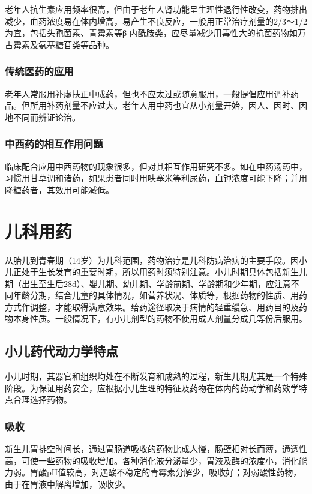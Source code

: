 老年人抗生素应用频率很高，但由于老年人肾功能呈生理性退行性改变，药物排出减少，血药浓度易在体内增高，易产生不良反应，一般用正常治疗剂量的2/3～1/2为宜，包括头孢菌素、青霉素等β-内酰胺类，应尽量减少用毒性大的抗菌药物如万古霉素及氨基糖苷类等品种。

\subsubsection{传统医药的应用}

老年人常服用补虚扶正中成药，但也不应太过或随意服用，一般提倡应用调补药品。但所用补药剂量不应过大。老年人用中药也宜从小剂量开始，因人、因时、因地不同而辨证论治。

\subsubsection{中西药的相互作用问题}

临床配合应用中西药物的现象很多，但对其相互作用研究不多。如在中药汤药中，习惯用甘草调和诸药，如果患者同时用呋塞米等利尿药，血钾浓度可能下降；并用降糖药者，其效用可能减低。

\section{儿科用药}

从胎儿到青春期（14岁）为儿科范围，药物治疗是儿科防病治病的主要手段。因小儿正处于生长发育的重要时期，所以用药时须特别注意。小儿时期具体包括新生儿期（出生至生后28d）、婴儿期、幼儿期、学龄前期、学龄期和少年期，应注意不同年龄分期，结合儿童的具体情况，如营养状况、体质等，根据药物的性质、用药方式作调整，才能取得满意效果。给药途径取决于病情的轻重缓急、用药目的及药物本身性质。一般情况下，有小儿剂型的药物不使用成人剂量分成几等份后服用。

\subsection{小儿药代动力学特点}

小儿时期，其器官和组织均处在不断发育和成熟的过程，新生儿期尤其是一个特殊阶段。为保证用药安全，应根据小儿生理的特征及药物在体内的药动学和药效学特点合理选择药物。

\subsubsection{吸收}

新生儿胃排空时间长，通过胃肠道吸收的药物比成人慢，肠壁相对长而薄，通透性高，可使一些药物的吸收增加。各种消化液分泌量少，胃液及酶的浓度小，消化能力弱。胃酸pH值较高，对遇酸不稳定的青霉素分解少，吸收好；对弱酸性药物，由于在胃液中解离增加，吸收少。


